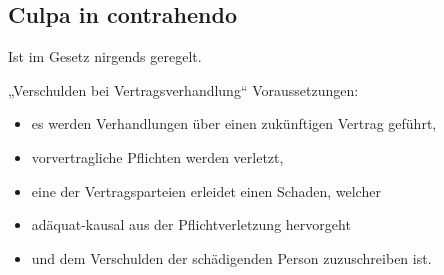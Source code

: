 \subsection{Culpa in contrahendo}

Ist im Gesetz nirgends geregelt.

„Verschulden bei Vertragsverhandlung`` Voraussetzungen:

\begin{itemize}
	\tightlist
	\item es werden Verhandlungen über einen zukünftigen Vertrag geführt,
	\item vorvertragliche Pflichten werden verletzt,
	\item eine der Vertragsparteien erleidet einen Schaden, welcher
	\item adäquat-kausal aus der Pflichtverletzung hervorgeht
	\item und dem Verschulden der schädigenden Person zuzuschreiben ist.
\end{itemize}
